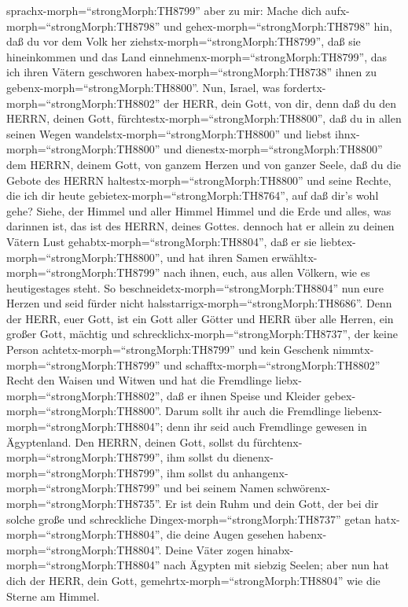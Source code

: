 sprachx-morph=``strongMorph:TH8799'' aber zu mir: Mache dich
aufx-morph=``strongMorph:TH8798'' und gehex-morph=``strongMorph:TH8798''
hin, daß du vor dem Volk her ziehstx-morph=``strongMorph:TH8799'', daß
sie hineinkommen und das Land einnehmenx-morph=``strongMorph:TH8799'',
das ich ihren Vätern geschworen habex-morph=``strongMorph:TH8738'' ihnen
zu gebenx-morph=``strongMorph:TH8800''.  Nun, Israel, was
fordertx-morph=``strongMorph:TH8802'' der HERR, dein Gott, von dir, denn
daß du den HERRN, deinen Gott, fürchtestx-morph=``strongMorph:TH8800'',
daß du in allen seinen Wegen wandelstx-morph=``strongMorph:TH8800'' und
liebst ihnx-morph=``strongMorph:TH8800'' und
dienestx-morph=``strongMorph:TH8800'' dem HERRN, deinem Gott, von ganzem
Herzen und von ganzer Seele,  daß du die Gebote des HERRN
haltestx-morph=``strongMorph:TH8800'' und seine Rechte, die ich dir
heute gebietex-morph=``strongMorph:TH8764'', auf daß dir's wohl gehe?
 Siehe, der Himmel und aller Himmel Himmel und die Erde und
alles, was darinnen ist, das ist des HERRN, deines Gottes. 
dennoch hat er allein zu deinen Vätern Lust
gehabtx-morph=``strongMorph:TH8804'', daß er sie
liebtex-morph=``strongMorph:TH8800'', und hat ihren Samen
erwähltx-morph=``strongMorph:TH8799'' nach ihnen, euch, aus allen
Völkern, wie es heutigestages steht.  So
beschneidetx-morph=``strongMorph:TH8804'' nun eure Herzen und seid
fürder nicht halsstarrigx-morph=``strongMorph:TH8686''. 
Denn der HERR, euer Gott, ist ein Gott aller Götter und HERR über alle
Herren, ein großer Gott, mächtig und
schrecklichx-morph=``strongMorph:TH8737'', der keine Person
achtetx-morph=``strongMorph:TH8799'' und kein Geschenk
nimmtx-morph=``strongMorph:TH8799''  und
schafftx-morph=``strongMorph:TH8802'' Recht den Waisen und Witwen und
hat die Fremdlinge liebx-morph=``strongMorph:TH8802'', daß er ihnen
Speise und Kleider gebex-morph=``strongMorph:TH8800''. 
Darum sollt ihr auch die Fremdlinge
liebenx-morph=``strongMorph:TH8804''; denn ihr seid auch Fremdlinge
gewesen in Ägyptenland.  Den HERRN, deinen Gott, sollst du
fürchtenx-morph=``strongMorph:TH8799'', ihm sollst du
dienenx-morph=``strongMorph:TH8799'', ihm sollst du
anhangenx-morph=``strongMorph:TH8799'' und bei seinem Namen
schwörenx-morph=``strongMorph:TH8735''.  Er ist dein Ruhm
und dein Gott, der bei dir solche große und schreckliche
Dingex-morph=``strongMorph:TH8737'' getan
hatx-morph=``strongMorph:TH8804'', die deine Augen gesehen
habenx-morph=``strongMorph:TH8804''.  Deine Väter zogen
hinabx-morph=``strongMorph:TH8804'' nach Ägypten mit siebzig Seelen;
aber nun hat dich der HERR, dein Gott,
gemehrtx-morph=``strongMorph:TH8804'' wie die Sterne am Himmel.


